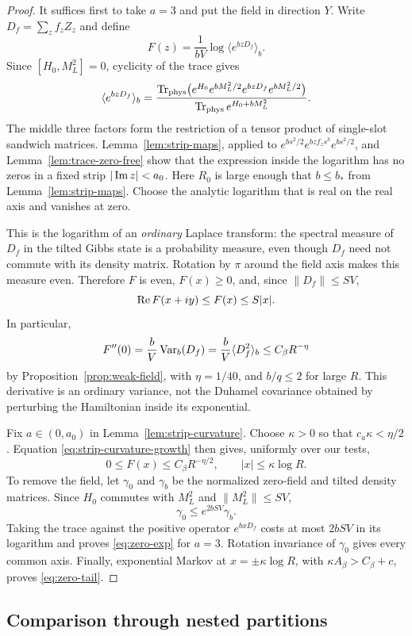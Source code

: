 \begin{proof}
It suffices first to take $a=3$ and put the field in direction $Y$.
Write $D_f=\sum_z f_zZ_z$ and define
\[
 F(z)=\frac{1}{bV}\log\langle e^{bzD_f}\rangle_b.
\]
Since $[H_0,M_L^2]=0$, cyclicity of the trace gives
\[
 \langle e^{bzD_f}\rangle_b
 =\frac{\operatorname{Tr}_{\rm phys}
       \bigl(e^{H_0}e^{bM_L^2/2}e^{bzD_f}e^{bM_L^2/2}\bigr)}
       {\operatorname{Tr}_{\rm phys}e^{H_0+bM_L^2}}.
\]
The middle three factors form the restriction of a tensor product of
single-slot sandwich matrices.  Lemma~\ref{lem:strip-maps}, applied to
$e^{bs^2/2}e^{bzf_zs^3}e^{bs^2/2}$, and
Lemma~\ref{lem:trace-zero-free} show that the expression inside the
logarithm has no zeros in a fixed strip $|\operatorname{Im} z|<a_0$.
Here $R_0$ is large enough that $b\le b_*$ from
Lemma~\ref{lem:strip-maps}.  Choose the analytic logarithm that is real
on the real axis and vanishes at zero.

This is the logarithm of an \emph{ordinary} Laplace transform: the
spectral measure of $D_f$ in the tilted Gibbs state is a probability
measure, even though $D_f$ need not commute with its density matrix.
Rotation by $\pi$ around the field axis makes this measure even.
Therefore $F$ is even, $F(x)\ge0$, and, since $\|D_f\|\le SV$,
\[
 \operatorname{Re} F(x+iy)\le F(x)\le S|x|.
\]
In particular,
\[
 F''(0)=\frac bV\operatorname{Var}_b(D_f)
       =\frac bV\langle D_f^2\rangle_b
       \le C_\beta R^{-\eta}
\]
by Proposition~\ref{prop:weak-field}, with $\eta=1/40$, and
$b/q\le2$ for large $R$.
This derivative is an ordinary variance, not the Duhamel covariance
obtained by perturbing the Hamiltonian inside its exponential.

Fix $a\in(0,a_0)$ in Lemma~\ref{lem:strip-curvature}.  Choose
$\kappa>0$ so that $c_a\kappa<\eta/2$.  Equation
\eqref{eq:strip-curvature-growth} then gives, uniformly over our tests,
\[
 0\le F(x)\le C_\beta R^{-\eta/2},
 \qquad |x|\le\kappa\log R.
\]
To remove the field, let $\gamma_0$ and $\gamma_b$ be the normalized
zero-field and tilted density matrices.  Since $H_0$ commutes with
$M_L^2$ and $\|M_L^2\|\le SV$,
\[
 \gamma_0\le e^{2bSV}\gamma_b.
\]
Taking the trace against the positive operator $e^{bxD_f}$ costs at
most $2bSV$ in its logarithm and proves \eqref{eq:zero-exp} for $a=3$.
Rotation invariance of $\gamma_0$ gives every common axis.
Finally, exponential Markov at $x=\pm\kappa\log R$, with
$\kappa A_\beta>C_\beta+c$, proves \eqref{eq:zero-tail}.
\end{proof}

\subsection{Comparison through nested partitions}


